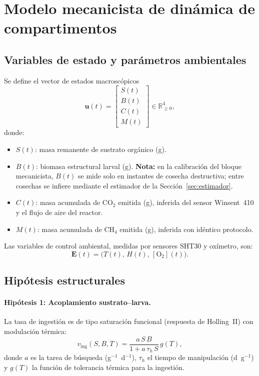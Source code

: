 \section{Modelo mecanicista de dinámica de compartimentos}

\subsection{Variables de estado y parámetros ambientales}

Se define el vector de estados macroscópicos
\begin{equation}
\mathbf{u}(t) = \begin{bmatrix} S(t) \\ B(t) \\ C(t) \\ M(t) \end{bmatrix} \in \mathbb{R}^4_{\geq 0},
\end{equation}
donde:
\begin{itemize}
    \item $S(t)$: masa remanente de sustrato orgánico (g).
    \item $B(t)$: biomasa estructural larval (g). \textbf{Nota:} en la calibración del bloque mecanicista, $B(t)$ se mide solo en instantes de cosecha destructiva; entre cosechas se infiere mediante el estimador de la Sección~\ref{sec:estimador}.
    \item $C(t)$: masa acumulada de $\mathrm{CO}_2$ emitida (g), inferida del sensor Winsent~410 y el flujo de aire del reactor.
    \item $M(t)$: masa acumulada de $\mathrm{CH}_4$ emitida (g), inferida con idéntico protocolo.
\end{itemize}

Las variables de control ambiental, medidas por sensores SHT30 y oxímetro, son:
\begin{equation}
\mathbf{E}(t) = \bigl( T(t),\, H(t),\, [\mathrm{O}_2](t) \bigr).
\end{equation}

\subsection{Hipótesis estructurales}

\paragraph{Hipótesis 1: Acoplamiento sustrato--larva.}
La tasa de ingestión es de tipo saturación funcional (respuesta de Holling~II) con modulación térmica:
\begin{equation}
\label{eq:ingestion}
v_{\text{ing}}(S,B,T) = \frac{a\,S\,B}{1 + a\,\tau_h\,S} \, g(T),
\end{equation}
donde $a$ es la tarea de búsqueda (g$^{-1}$~d$^{-1}$), $\tau_h$ el tiempo de manipulación (d~g$^{-1}$) y $g(T)$ la función de tolerancia térmica para la ingestión.

